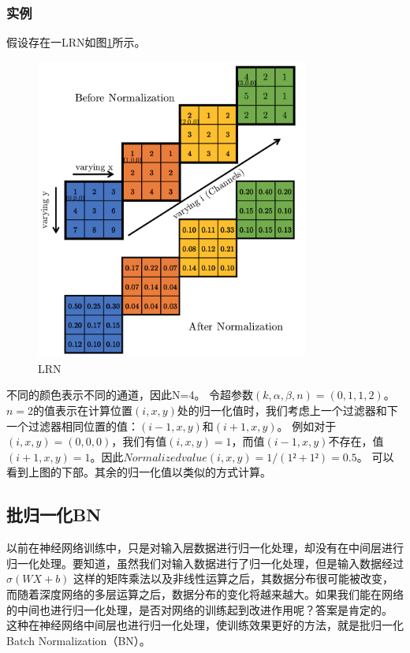 \documentclass[UTF8]{ctexart}
\begin{document}
\subsubsection{实例}
假设存在一LRN如图\ref{LRN2}所示。
\begin{figure}[htb]
	\centering
	\includegraphics[width=0.8\textwidth]{figures/LRN2.png}
	\caption{LRN}
	\label{LRN2}
\end{figure}
\par 不同的颜色表示不同的通道，因此N=4。
令超参数$(k,\alpha,\beta,n) = (0, 1, 1, 2)$。
$n=2$的值表示在计算位置$(i,x,y)$处的归一化值时，我们考虑上一个过滤器和下一个过滤器相同位置的值：$(i-1, x, y)$和$(i + 1, x, y)$。
例如对于$(i, x, y) =(0, 0, 0)$，我们有值$(i, x, y) = 1$，而值$(i-1,x, y)$不存在，值$(i +1, x, y) = 1$。因此$Normalized value (i, x, y) = 1 /(1²+ 1²) = 0.5$。
可以看到上图的下部。其余的归一化值以类似的方式计算。

\subsection{批归一化BN}
以前在神经网络训练中，只是对输入层数据进行归一化处理，却没有在中间层进行归一化处理。要知道，虽然我们对输入数据进行了归一化处理，但是输入数据经过 $ \sigma(WX+b) $ 这样的矩阵乘法以及非线性运算之后，其数据分布很可能被改变，而随着深度网络的多层运算之后，数据分布的变化将越来越大。如果我们能在网络的中间也进行归一化处理，是否对网络的训练起到改进作用呢？答案是肯定的。 
这种在神经网络中间层也进行归一化处理，使训练效果更好的方法，就是批归一化Batch Normalization（BN）。
\end{document}
